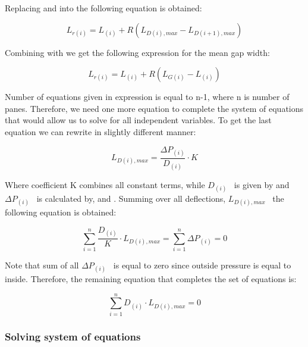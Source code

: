 Replacing and into the following equation is obtained:

\begin{equation}
{L_{r\left( i \right)}} = {L_{\left( i \right)}} + R\left( {{L_{D\left( i \right),max}} - {L_{D\left( {i + 1} \right),max}}} \right)
\end{equation}

Combining with we get the following expression for the mean gap width:

\begin{equation}
{L_{r\left( i \right)}} = {L_{\left( i \right)}} + R\left( {{L_{G\left( i \right)}} - {L_{\left( i \right)}}} \right)
\end{equation}

Number of equations given in expression is equal to n-1, where n is number of panes. Therefore, we need one more equation to complete the system of equations that would allow us to solve for all independent variables. To get the last equation we can rewrite in slightly different manner:

\begin{equation}
{L_{D\left( i \right),max}} = \frac{{\Delta {P_{\left( i \right)}}}}{{{D_{\left( i \right)}}}}\cdot K
\end{equation}

Where coefficient K combines all constant terms, while \({D_{\left( i \right)}}\) ~is given by and \(\Delta {P_{\left( i \right)}}\) ~is calculated by, and . Summing over all deflections, \({L_{D\left( i \right),max}}\) ~the following equation is obtained:

\begin{equation}
\mathop \sum \limits_{i = 1}^n \frac{{{D_{\left( i \right)}}}}{K}\cdot {L_{D\left( i \right),max}} = \mathop \sum \limits_{i = 1}^n \Delta {P_{\left( i \right)}} = 0
\end{equation}

Note that sum of all \(\Delta {P_{\left( i \right)}}\) ~is equal to zero since outside pressure is equal to inside. Therefore, the remaining equation that completes the set of equations is:

\begin{equation}
\mathop \sum \limits_{i = 1}^n {D_{\left( i \right)}}\cdot {L_{D\left( i \right),max}} = 0
\end{equation}

\subsubsection{Solving system of equations}\label{solving-system-of-equations}

